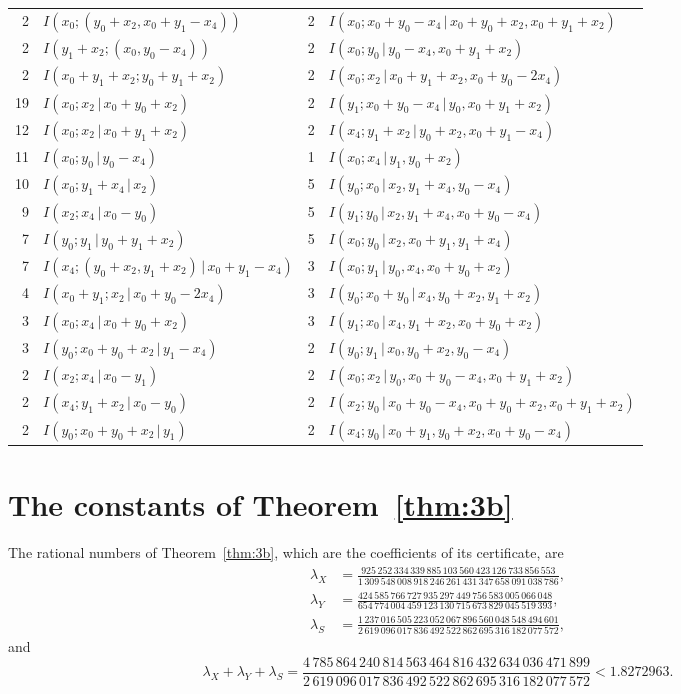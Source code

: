 \documentclass[11pt]{amsart}
\theoremstyle{definition}
\theoremstyle{remark}
\numberwithin{equation}{section}
\newcommand{\CbUp}{1.8272963}
\newcommand{\CbFrac}{\frac{4\,785\,864\,240\,814\,563\,464\,816\,432\,634\,036\,471\,899}{2\,619\,096\,017\,836\,492\,522\,862\,695\,316\,182\,077\,572}}
\newcommand{\CbLamXd}{\frac{925\,252\,334\,339\,885\,103\,560\,423\,126\,733\,856\,553}{1\,309\,548\,008\,918\,246\,261\,431\,347\,658\,091\,038\,786}}
\newcommand{\CbLamYd}{\frac{424\,585\,766\,727\,935\,297\,449\,756\,583\,005\,066\,048}{654\,774\,004\,459\,123\,130\,715\,673\,829\,045\,519\,393}}
\newcommand{\CbLamSd}{\frac{1\,237\,016\,505\,223\,052\,067\,896\,560\,048\,548\,494\,601}{2\,619\,096\,017\,836\,492\,522\,862\,695\,316\,182\,077\,572}}
\begin{document}
\begin{table}[p]
\begin{tabular}{@{}rl@{\quad}rl@{}}
2 & $I(x_0;(y_0+x_2, x_0+y_1-x_4))$ & 2 & $I(x_0;x_0+y_0-x_4\,|\,x_0+y_0+x_2, x_0+y_1+x_2)$ \\
2 & $I(y_1+x_2;(x_0, y_0-x_4))$ & 2 & $I(x_0;y_0\,|\,y_0-x_4, x_0+y_1+x_2)$ \\
2 & $I(x_0+y_1+x_2;y_0+y_1+x_2)$ & 2 & $I(x_0;x_2\,|\,x_0+y_1+x_2, x_0+y_0-2x_4)$ \\
19 & $I(x_0;x_2\,|\,x_0+y_0+x_2)$ & 2 & $I(y_1;x_0+y_0-x_4\,|\,y_0, x_0+y_1+x_2)$ \\
12 & $I(x_0;x_2\,|\,x_0+y_1+x_2)$ & 2 & $I(x_4;y_1+x_2\,|\,y_0+x_2, x_0+y_1-x_4)$ \\
11 & $I(x_0;y_0\,|\,y_0-x_4)$ & 1 & $I(x_0;x_4\,|\,y_1, y_0+x_2)$ \\
10 & $I(x_0;y_1+x_4\,|\,x_2)$ & 5 & $I(y_0;x_0\,|\,x_2, y_1+x_4, y_0-x_4)$ \\
9 & $I(x_2;x_4\,|\,x_0-y_0)$ & 5 & $I(y_1;y_0\,|\,x_2, y_1+x_4, x_0+y_0-x_4)$ \\
7 & $I(y_0;y_1\,|\,y_0+y_1+x_2)$ & 5 & $I(x_0;y_0\,|\,x_2, x_0+y_1, y_1+x_4)$ \\
7 & $I(x_4;(y_0+x_2, y_1+x_2)\,|\,x_0+y_1-x_4)$ & 3 & $I(x_0;y_1\,|\,y_0, x_4, x_0+y_0+x_2)$ \\
4 & $I(x_0+y_1;x_2\,|\,x_0+y_0-2x_4)$ & 3 & $I(y_0;x_0+y_0\,|\,x_4, y_0+x_2, y_1+x_2)$ \\
3 & $I(x_0;x_4\,|\,x_0+y_0+x_2)$ & 3 & $I(y_1;x_0\,|\,x_4, y_1+x_2, x_0+y_0+x_2)$ \\
3 & $I(y_0;x_0+y_0+x_2\,|\,y_1-x_4)$ & 2 & $I(y_0;y_1\,|\,x_0, y_0+x_2, y_0-x_4)$ \\
2 & $I(x_2;x_4\,|\,x_0-y_1)$ & 2 & $I(x_0;x_2\,|\,y_0, x_0+y_0-x_4, x_0+y_1+x_2)$ \\
2 & $I(x_4;y_1+x_2\,|\,x_0-y_0)$ & 2 & $I(x_2;y_0\,|\,x_0+y_0-x_4, x_0+y_0+x_2, x_0+y_1+x_2)$ \\
2 & $I(y_0;x_0+y_0+x_2\,|\,y_1)$ & 2 & $I(x_4;y_0\,|\,x_0+y_1, y_0+x_2, x_0+y_0-x_4)$ \\
\bottomrule
\end{tabular}
\end{table}

\FloatBarrier
\section{The constants of Theorem~\ref{thm:3b}}\label{app:const}

The rational numbers of Theorem~\ref{thm:3b}, which are the coefficients of its certificate, are
\begin{align*}
\lambda_X&=\CbLamXd,\\
\lambda_Y&=\CbLamYd,\\
\lambda_S&=\CbLamSd,
\end{align*}
and
\[
\lambda_X+\lambda_Y+\lambda_S=\CbFrac<\CbUp.
\]
\end{document}
